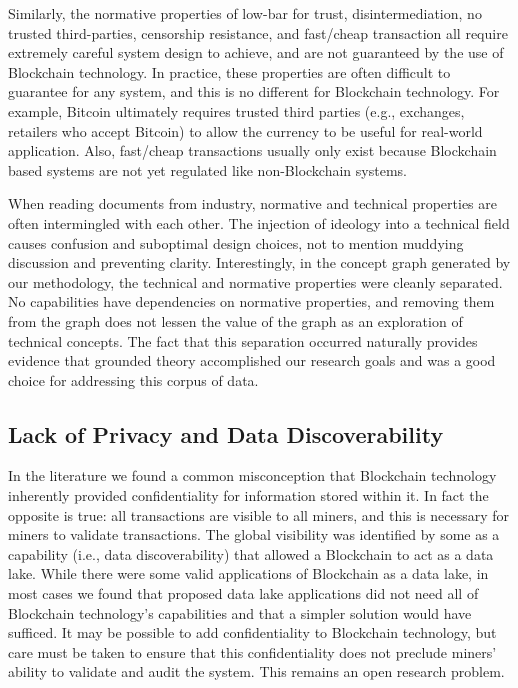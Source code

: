 Similarly, the normative properties of low-bar for trust, disintermediation, no trusted third-parties, censorship resistance, and fast/cheap transaction all require extremely careful system design to achieve, and are not guaranteed by the use of Blockchain technology.
In practice, these properties are often difficult to guarantee for any system, and this is no different for Blockchain technology.
For example, Bitcoin ultimately requires trusted third parties (e.g., exchanges, retailers who accept Bitcoin) to allow the currency to be useful for real-world application.
Also, fast/cheap transactions usually only exist because Blockchain based systems are not yet regulated like non-Blockchain systems.

When reading documents from industry, normative and technical properties are often intermingled with each other.
The injection of ideology into a technical field causes confusion and suboptimal design choices, not to mention muddying discussion and preventing clarity.
Interestingly, in the concept graph generated by our methodology, the technical and normative properties were cleanly separated.
No capabilities have dependencies on normative properties, and removing them from the graph does not lessen the value of the graph as an exploration of technical concepts.
The fact that this separation occurred naturally provides evidence that grounded theory accomplished our research goals and was a good choice for addressing this corpus of data.


\subsection{Lack of Privacy and Data Discoverability}
In the literature we found a common misconception that Blockchain technology inherently provided confidentiality for information stored within it.
In fact the opposite is true: all transactions are visible to all miners, and this is necessary for miners to validate transactions.
The global visibility was identified by some as a capability (i.e., data discoverability) that allowed a Blockchain to act as a data lake.
While there were some valid applications of Blockchain as a data lake, in most cases we found that proposed data lake applications did not need all of Blockchain technology's capabilities and that a simpler solution would have sufficed.
It may be possible to add confidentiality to Blockchain technology, but care must be taken to ensure that this confidentiality does not preclude miners' ability to validate and audit the system.
This remains an open research problem.


